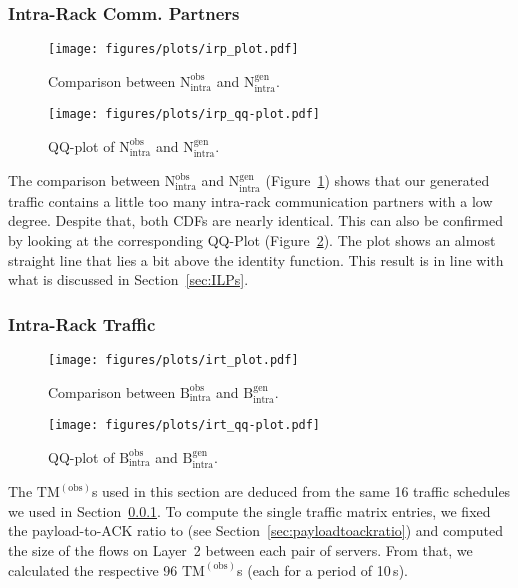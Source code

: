 \documentclass[journal,10pt]{IEEEtran}
\newcommand{\obstm}{\ensuremath{\mathrm{TM}^{(\mathrm{obs})}}}
\newcommand{\bytes}[2]{\ensuremath{\mathrm{B}^{\mathrm{#1}}_{\mathrm{#2}}}}
\newcommand{\partners}[2]{\ensuremath{\mathrm{N}^{\mathrm{#1}}_{\mathrm{#2}}}}
\begin{document}
				
		
		
		\subsubsection{Intra-Rack Comm. Partners}
		\label{sec:Intra-RackCommPartners}
		\begin{figure}
			\centering
				\texttt{[image: figures/plots/irp\_plot.pdf]}
				\caption{Comparison between \partners{obs}{intra} and \partners{gen}{intra}.}
				\label{fig:irp_plot}
\end{figure}
		
		\begin{figure}
			\centering
				\texttt{[image: figures/plots/irp\_qq-plot.pdf]}
					\caption{QQ-plot of \partners{obs}{intra} and \partners{gen}{intra}.}
				\label{fig:irp_qq-plot}
\end{figure}
		The comparison between \partners{obs}{intra} and \partners{gen}{intra}
		(Figure~\ref{fig:irp_plot})
		shows that our generated traffic contains a little too many intra-rack communication partners with a low degree.
		Despite that, both CDFs are nearly identical. This can also be confirmed by looking at the corresponding QQ-Plot (Figure~\ref{fig:irp_qq-plot}).
		The plot shows an almost straight line that lies a bit above the identity function.
		This result is in line with what is discussed in Section~\ref{sec:ILPs}.


		\subsubsection{Intra-Rack Traffic}
		\begin{figure}
			\centering
				\texttt{[image: figures/plots/irt\_plot.pdf]}
				\caption{Comparison between \bytes{obs}{intra} and \bytes{gen}{intra}.}
				\label{fig:irt_plot}
\end{figure}
		
		\begin{figure}
			\centering
				\texttt{[image: figures/plots/irt\_qq-plot.pdf]}
				\caption{QQ-plot of \bytes{obs}{intra} and \bytes{gen}{intra}.}
				\label{fig:irt_qq-plot}
\end{figure}
		The \obstm{}s used in this section are deduced from the same 16 traffic schedules we used
		in Section~\ref{sec:Intra-RackCommPartners}. To compute the single traffic matrix entries, we
		fixed the payload-to-ACK ratio  to  (see Section~\ref{sec:payloadtoackratio})
		and computed the size of the flows on Layer~2 between each pair of servers. 
		From that, we calculated the respective 96 \obstm{}s (each for a period of 10\,s).
		
\end{document}
